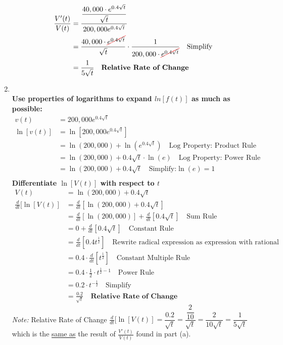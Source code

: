 \begin{example}
\begin{solL}
\begin{enumerate}[leftmargin=*]
\begin{displaymath}
\begin{split}
        \frac{V'(t)}{V(t)}&=\frac{\dfrac{40,000\cdot e^{0.4\sqrt{t}}}{\sqrt{t}}}{200,000e^{0.4\sqrt{t}} } \\
        &=\frac{40,000\cdot \Ccancel[red]{e^{0.4\sqrt{t}}}}{\sqrt{t}}\cdot \frac{1}{200,000\cdot \Ccancel[red]{e^{0.4\sqrt{t}}}}  \quad \text{Simplify}\\
        &=\frac{1}{5\sqrt{t}} \quad \textbf{Relative Rate of Change}
    \end{split}
\end{displaymath} 
\newpage
\item \hfill \\
\newline
\textbf{Use properties of logarithms to expand $ln[f(t)]$ as much as possible:}
\begin{displaymath}
    \begin{split}
        v(t)&=200,000e^{0.4\sqrt{t}} \\
        \ln[v(t)]&=\ln\left[200,000e^{0.4\sqrt{t}}\right] \\
        &=\ln(200,000)+\ln\left(e^{0.4\sqrt{t}}\right) \quad \text{Log Property: Product Rule}\\
        &=\ln(200,000)+0.4\sqrt{t}\cdot\ln(e) \quad \text{Log Property: Power Rule}\\
        &=\ln(200,000)+0.4\sqrt{t} \quad \text{Simplify:} \ln(e)=1\\
    \end{split}
\end{displaymath}
\textbf{Differentiate $\ln[V(t)]$ with respect to $t$}
\begin{displaymath}
    \begin{split}
    V(t)&=\ln(200,000)+0.4\sqrt{t}\\
        \frac{d}{dt}[\ln[V(t)]&=\frac{d}{dt}[\ln(200,000)+0.4\sqrt{t}] \\
        &=\frac{d}{dt}[\ln(200,000)]+\frac{d}{dt}[0.4\sqrt{t}] \quad \text{Sum Rule} \\
        &=0+\frac{d}{dt}[0.4\sqrt{t}] \quad \text{Constant Rule} \\
        &=\frac{d}{dt}[0.4t^{\frac{1}{2}}] \quad \text{Rewrite radical expression as expression with rational exponent}\\
        &=0.4\cdot \frac{d}{dt}[t^{\frac{1}{2}}] \quad \text{Constant Multiple Rule}\\
        &=0.4\cdot \frac{1}{2}\cdot t^{\frac{1}{2}-1} \quad \text{Power Rule}\\
        &=0.2\cdot t^{-\frac{1}{2}} \quad \text{Simplify}\\
        &=\frac{0.2}{\sqrt{t}} \quad \textbf{Relative Rate of Change}
    \end{split}
\end{displaymath}
\emph{Note:} Relative Rate of Change $\frac{d}{dt}[\ln[V(t)]=\dfrac{0.2}{\sqrt{t}}=\dfrac{\dfrac{2}{10}}{\sqrt{t}}=\dfrac{2}{10\sqrt{t}}=\dfrac{1}{5\sqrt{t}}$ which is the \underline{same as} the result of $\frac{V'(t)}{V(t)}$ found in part (a).


\end{enumerate}
\end{solL}
\end{example}
